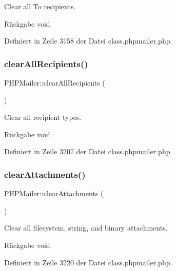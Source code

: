 Clear all To recipients. \begin{DoxyReturn}{Rückgabe}
void 
\end{DoxyReturn}


Definiert in Zeile 3158 der Datei class.\+phpmailer.\+php.

\mbox{\label{class_p_h_p_mailer_a9e50d689e115e948c49d38d5dc154db6}} 
\subsubsection{\texorpdfstring{clear\+All\+Recipients()}{clearAllRecipients()}}
{\footnotesize\ttfamily P\+H\+P\+Mailer\+::clear\+All\+Recipients (\begin{DoxyParamCaption}{ }\end{DoxyParamCaption})}

Clear all recipient types. \begin{DoxyReturn}{Rückgabe}
void 
\end{DoxyReturn}


Definiert in Zeile 3207 der Datei class.\+phpmailer.\+php.

\mbox{\label{class_p_h_p_mailer_a4e56a18ac260e14293214c8aaad64e0b}} 
\subsubsection{\texorpdfstring{clear\+Attachments()}{clearAttachments()}}
{\footnotesize\ttfamily P\+H\+P\+Mailer\+::clear\+Attachments (\begin{DoxyParamCaption}{ }\end{DoxyParamCaption})}

Clear all filesystem, string, and binary attachments. \begin{DoxyReturn}{Rückgabe}
void 
\end{DoxyReturn}


Definiert in Zeile 3220 der Datei class.\+phpmailer.\+php.

\mbox{\label{class_p_h_p_mailer_aa21c721f20350fd24785b0e757974044}} 
